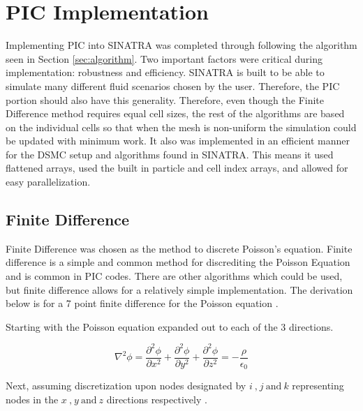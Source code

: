 \section{PIC Implementation}

Implementing PIC into SINATRA was completed through following the algorithm seen in Section \ref{sec:algorithm}. Two important factors were critical during implementation: robustness and efficiency. SINATRA is built to be able to simulate many different fluid scenarios chosen by the user. Therefore, the PIC portion should also have this generality. Therefore, even though the Finite Difference method requires equal cell sizes, the rest of the algorithms are based on the individual cells so that when the mesh is non-uniform the simulation could be updated with minimum work. It also was implemented in an efficient manner for the DSMC setup and algorithms found in SINATRA. This means it used flattened arrays, used the built in particle and cell index arrays, and allowed for easy parallelization. 

\subsection{Finite Difference}
\label{sec:finite_diff}

\indent Finite Difference was chosen as the method to discrete Poisson's equation. Finite difference is a simple and common method for discrediting the Poisson Equation and is common in PIC codes. There are other algorithms which could be used, but finite difference allows for a relatively simple implementation. The derivation below is for a 7 point finite difference for the Poisson equation \cite{FD_GS} \cite{FDM}.

Starting with the Poisson equation expanded out to each of the 3 directions. 

\begin{equation}
    \label{eqn:poisson_expanded}
    \nabla^2 \phi = \frac{\partial^2 \phi}{\partial x^2} + \frac{\partial^2 \phi}{\partial y^2} + \frac{\partial^2 \phi}{\partial z^2} = - \frac{\rho}{\epsilon_0}
\end{equation}

Next, assuming discretization upon nodes designated by \(i \: \text{,} \: j \: \text{and} \: k\) representing nodes in the \(x \: \text{,} \: y \: \text{and} \: z\) directions respectively \cite{FD_GS}. 

